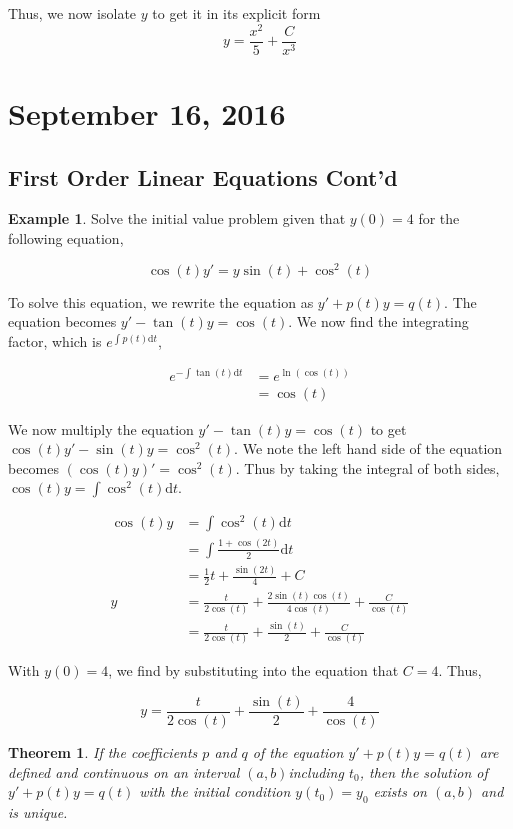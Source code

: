 \documentclass[11pt]{article}
\theoremstyle{plain} %
\newtheorem*{theorem}{Theorem}
\theoremstyle{definition}
\theoremstyle{example}
\newtheorem*{example}{Example}
\theoremstyle{remark}
\begin{document}
Thus, we now isolate $y$ to get it in its explicit form $$y = \frac{x^2}{5}+\frac{C}{x^3}$$


\section{September 16, 2016}
\subsection{First Order Linear Equations Cont'd}


\begin{example}
Solve the initial value problem given that $y(0) = 4$ for the following equation,

$$\cos(t)y'=y\sin(t)+\cos^2(t)$$
\end{example}

To solve this equation, we rewrite the equation as $y' + p(t)y = q(t)$. The equation becomes $y' -\tan(t)y = \cos(t)$. We now find the integrating factor, which is $e^{\int p(t)\mathrm d t}$, 

\begin{align*}
	e^{-\int\tan(t) \mathrm d t} &= e^{\ln(\cos(t))}\\
	&= \cos(t)
	\end{align*}
	
	We now multiply the equation $y' - \tan(t)y = \cos(t)$ to get $\cos(t)y' - \sin(t)y = \cos^2(t)$. We note the left hand side of the equation becomes $\left(\cos(t)y\right)' = \cos^2(t)$. Thus by taking the integral of both sides, $\cos(t)y = \int\cos^2(t) \mathrm d t$. 
	
	\begin{align*}
		\cos(t)y &= \int\cos^2(t) \mathrm d t\\
		&= \int \frac{1+\cos(2t)}{2} \mathrm d t \\
		&= \frac{1}{2}t + \frac{\sin(2t)}{4}+ C \\
		y &= \frac{t}{2\cos(t)} + \frac{2\sin(t)\cos(t)}{4\cos(t)} + \frac{C}{\cos(t)}\\
		&= \frac{t}{2\cos(t)}+ \frac{\sin(t)}{2} + \frac{C}{\cos(t)}
	\end{align*}
	
With $y(0)=4$, we find by substituting into the equation that $C = 4$. Thus, 

$$y = \frac{t}{2\cos(t)} + \frac{\sin(t)}{2} + \frac{4}{\cos(t)}$$

\begin{theorem}
If the coefficients $p$ and $q$ of the equation $y' + p(t)y = q(t)$ are defined and continuous on an interval $(a,b)$including $t_0$, then the solution of $y' + p(t)y = q(t)$ with the initial condition $y(t_0) = y_0$ exists on $(a,b)$ and is unique. 
\end{theorem}
\end{document}
